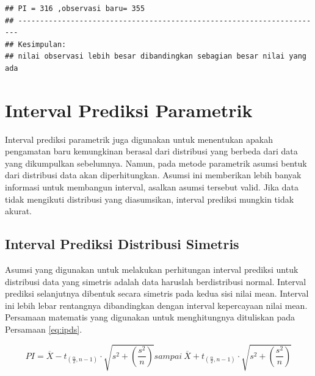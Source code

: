 \documentclass[]{book}
\newenvironment{Shaded}{\begin{snugshade}}{\end{snugshade}}
\newcommand{\KeywordTok}[1]{\textcolor[rgb]{0.13,0.29,0.53}{\textbf{#1}}}
\newcommand{\DataTypeTok}[1]{\textcolor[rgb]{0.13,0.29,0.53}{#1}}
\newcommand{\DecValTok}[1]{\textcolor[rgb]{0.00,0.00,0.81}{#1}}
\newcommand{\FloatTok}[1]{\textcolor[rgb]{0.00,0.00,0.81}{#1}}
\newcommand{\StringTok}[1]{\textcolor[rgb]{0.31,0.60,0.02}{#1}}
\newcommand{\OperatorTok}[1]{\textcolor[rgb]{0.81,0.36,0.00}{\textbf{#1}}}
\newcommand{\NormalTok}[1]{#1}
\begin{document}
\begin{Shaded}
\end{Shaded}

\begin{verbatim}
## PI = 316 ,observasi baru= 355
## ----------------------------------------------------------------------
## Kesimpulan:
## nilai observasi lebih besar dibandingkan sebagian besar nilai yang ada
\end{verbatim}

\section{Interval Prediksi
Parametrik}\label{interval-prediksi-parametrik}

Interval prediksi parametrik juga digunakan untuk menentukan apakah
pengamatan baru kemungkinan berasal dari distribusi yang berbeda dari
data yang dikumpulkan sebelumnya. Namun, pada metode parametrik asumsi
bentuk dari distribusi data akan diperhitungkan. Asumsi ini memberikan
lebih banyak informasi untuk membangun interval, asalkan asumsi tersebut
valid. Jika data tidak mengikuti distribusi yang diasumsikan, interval
prediksi mungkin tidak akurat.

\subsection{Interval Prediksi Distribusi
Simetris}\label{interval-prediksi-distribusi-simetris}

Asumsi yang digunakan untuk melakukan perhitungan interval prediksi
untuk distribusi data yang simetris adalah data haruslah berdistribusi
normal. Interval prediksi selanjutnya dibentuk secara simetris pada
kedua sisi nilai mean. Interval ini lebih lebar rentangnya dibandingkan
dengan interval kepercayaan nilai mean. Persamaan matematis yang
digunakan untuk menghitungnya dituliskan pada Persamaan \eqref{eq:ipds}.

\begin{equation}
  PI=\overline{X}-t_{\left(\frac{\alpha}{2},n-1\right)}\cdot\sqrt{s^2+\left(\frac{s^2}{n}\right)}sampai\ \overline{X}+t_{\left(\frac{\alpha}{2},n-1\right)}\cdot\sqrt{s^2+\left(\frac{s^2}{n}\right)}
  \label{eq:ipds}
\end{equation}
\end{document}
